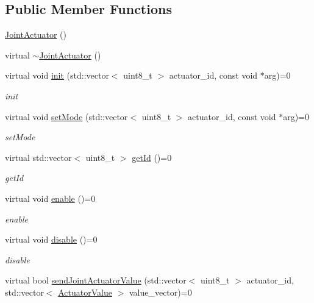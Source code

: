 \subsection*{Public Member Functions}
\begin{DoxyCompactItemize}
\item 
\hyperlink{classrobotis__manipulator_1_1_joint_actuator_a105f09b15736f833bdb7ee3007c02a43}{Joint\+Actuator} ()
\item 
virtual \hyperlink{classrobotis__manipulator_1_1_joint_actuator_a8ecdaaabb57c7e0774f49779f756d488}{$\sim$\+Joint\+Actuator} ()
\item 
virtual void \hyperlink{classrobotis__manipulator_1_1_joint_actuator_a8573f4c73d9653d0dafc2178fca85c71}{init} (std\+::vector$<$ uint8\+\_\+t $>$ actuator\+\_\+id, const void $\ast$arg)=0
\begin{DoxyCompactList}\small\item\em init \end{DoxyCompactList}\item 
virtual void \hyperlink{classrobotis__manipulator_1_1_joint_actuator_a326759d58b0d95f4140c7615c585534d}{set\+Mode} (std\+::vector$<$ uint8\+\_\+t $>$ actuator\+\_\+id, const void $\ast$arg)=0
\begin{DoxyCompactList}\small\item\em set\+Mode \end{DoxyCompactList}\item 
virtual std\+::vector$<$ uint8\+\_\+t $>$ \hyperlink{classrobotis__manipulator_1_1_joint_actuator_a6ba533ba29c662db7c806762735e9c9c}{get\+Id} ()=0
\begin{DoxyCompactList}\small\item\em get\+Id \end{DoxyCompactList}\item 
virtual void \hyperlink{classrobotis__manipulator_1_1_joint_actuator_a08e3ca20664d47a12810b0c3cec38b5b}{enable} ()=0
\begin{DoxyCompactList}\small\item\em enable \end{DoxyCompactList}\item 
virtual void \hyperlink{classrobotis__manipulator_1_1_joint_actuator_a44f91bec9d60f61fe9158d94051602a7}{disable} ()=0
\begin{DoxyCompactList}\small\item\em disable \end{DoxyCompactList}\item 
virtual bool \hyperlink{classrobotis__manipulator_1_1_joint_actuator_abfae426680e7567920b54afd1f5c585a}{send\+Joint\+Actuator\+Value} (std\+::vector$<$ uint8\+\_\+t $>$ actuator\+\_\+id, std\+::vector$<$ \hyperlink{namespacerobotis__manipulator_a26f478d98222f9ce1bf66c7df248037b}{Actuator\+Value} $>$ value\+\_\+vector)=0

\end{DoxyCompactItemize}
